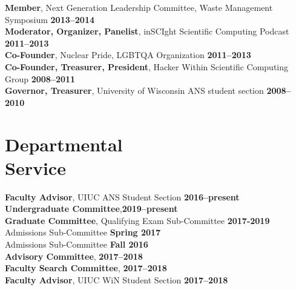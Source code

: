 \documentclass[margin,line]{resume}
\begin{document}
\begin{resume}
                \textbf{Member}, Next Generation Leadership Committee, Waste Management Symposium  \hfill \textbf{2013--2014}\vspace{.5mm}\\%
                \textbf{Moderator, Organizer, Panelist}, inSCIght Scientific Computing Podcast  \hfill \textbf{2011--2013}\vspace{.5mm}\\%
                \textbf{Co-Founder}, Nuclear Pride, LGBTQA Organization  \hfill \textbf{2011--2013}\vspace{.5mm}\\%
                \textbf{Co-Founder, Treasurer, President}, Hacker Within Scientific Computing Group  \hfill \textbf{2008--2011}\vspace{.5mm}\\%
                \textbf{Governor, Treasurer}, University of Wisconsin ANS student section  \hfill \textbf{2008--2010}\vspace{.5mm}%
    \section{\mysidestyle Departmental\\Service}
                \textbf{Faculty Advisor}, UIUC ANS Student Section \hfill \textbf{2016--present}\vspace{.5mm}\\%
                \textbf{Undergraduate Committee},\hfill \textbf{2019--present}\vspace{.5mm}\\%
                \textbf{Graduate Committee}, Qualifying Exam Sub-Committee \hfill \textbf{2017-2019}\vspace{.5mm}\\%
                                             Admissions Sub-Committee \hfill \textbf{Spring 2017}\vspace{.5mm}\\%
                                             Admissions Sub-Committee \hfill \textbf{Fall 2016}\vspace{.5mm}\\%
                \textbf{Advisory Committee}, \hfill \textbf{2017--2018}\vspace{.5mm}\\%
                \textbf{Faculty Search Committee}, \hfill \textbf{2017--2018}\vspace{.5mm}\\%
                \textbf{Faculty Advisor}, UIUC WiN Student Section \hfill \textbf{2017--2018}\vspace{.5mm}\\%

\end{resume}
\end{document}
